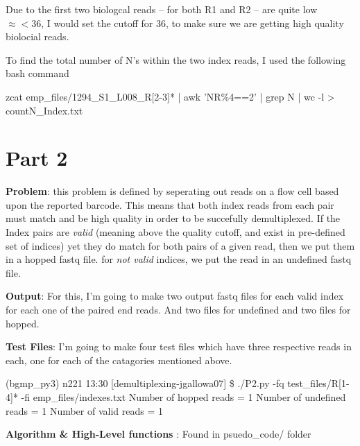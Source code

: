 \documentclass{article}
\begin{document}
\begin{enumerate}
\begin{description}
     \item

    Due to the first two biologcal reads -- for both R1 and R2 -- 
    are quite low $\approx < 36$, I would set the cutoff for 36, to make 
    sure we are getting high quality biolocial reads.

    \newpage
    \item

    To find the total number of N's within the two index reads, 
    I used the following bash command


    zcat emp\_files/1294\_S1\_L008\_R[2-3]* | awk 'NR\%4==2' | grep N | wc -l > countN\_Index.txt

\end{description}
\end{enumerate}

\section*{Part 2}

\textbf{Problem}: this problem is defined by seperating out reads on a flow cell based upon
the reported barcode. This means that both index reads from each pair must match and be high
quality in order to be succefully demultiplexed. 
If the Index pairs are 
\textit{valid} (meaning above the quality cutoff, and exist in pre-defined set of indices)  
yet they do match for both pairs of a given read, then we put them in a hopped fastq file.
for \textit{not valid} indices, we put the read in an undefined fastq file.

\textbf{Output}: For this, I'm going to make two output fastq files for each valid index 
for each one of the paired end reads. And two files for undefined and two files for hopped.

\textbf{Test Files}: I'm going to make four test files which have three respective reads 
in each, one for each of the catagories mentioned above. 

(bgmp\_py3) n221 13:30 [demultiplexing-jgallowa07] \$ ./P2.py -fq test\_files/R[1-4]* -fi emp\_files/indexes.txt 
Number of hopped reads = 1
Number of undefined reads = 1
Number of valid reads = 1

\textbf{Algorithm \& High-Level functions} : Found in psuedo\_code/ folder





 
\end{document}
